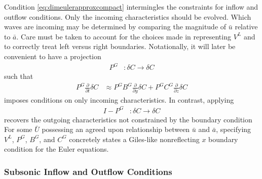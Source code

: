 Condition \eqref{eq:dimeulerapproxcompact} intermingles the constraints for
inflow and outflow conditions.  Only the incoming characteristics should be
evolved.  Which waves are incoming may be determined by comparing the magnitude
of $\bar{u}$ relative to $\bar{a}$.  Care must be taken to account for the
choices made in representing $V^L$ and to correctly treat left versus right
boundaries.  Notationally, it will later be convenient to have a
projection
\begin{align}
\label{eq:PG}
  P^G
  &:
  \delta{C} \to \delta{C}
\end{align}
such that
\begin{align}
\label{eq:dimeulerapproxchar}
  P^G
  \frac{\partial\!}{\partial\!t}
  \delta{}C
  &\approx
  P^G B^G
  \frac{\partial\!}{\partial\!y}
  \delta{}C
  +
  P^G C^G
  \frac{\partial\!}{\partial\!z}
  \delta{}C
\end{align}
imposes conditions on only incoming characteristics.  In contrast, applying
\begin{align}
 I - P^G
 &:
 \delta{C} \to \delta{C}
\end{align}
recovers the outgoing characteristics not constrained by the boundary condition
For some $\bar{U}$ possessing an agreed upon relationship between $\bar{u}$ and
$\bar{a}$, specifying $V^L$, $P^G$, $B^G$, and $C^G$ concretely states a
Giles-like nonreflecting $x$ boundary condition for the Euler equations.

\subsubsection{Subsonic Inflow and Outflow Conditions}
\label{sec:medidainflowoutflow}

